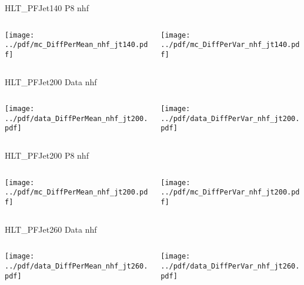 \documentclass[9pt]{beamer}
\begin{document}
\begin{frame}[t]{HLT\_PFJet140 P8 nhf}
\begin{columns}[T]
  \begin{column}{.5\textwidth}
  \texttt{[image: ../pdf/mc\_DiffPerMean\_nhf\_jt140.pdf]}
  \end{column}
  \begin{column}{.5\textwidth}
  \texttt{[image: ../pdf/mc\_DiffPerVar\_nhf\_jt140.pdf]}
  \end{column}
\end{columns}
\end{frame}

\begin{frame}[t]{HLT\_PFJet200 Data nhf}
\begin{columns}[T]
  \begin{column}{.5\textwidth}
  \texttt{[image: ../pdf/data\_DiffPerMean\_nhf\_jt200.pdf]}
  \end{column}
  \begin{column}{.5\textwidth}
  \texttt{[image: ../pdf/data\_DiffPerVar\_nhf\_jt200.pdf]}
  \end{column}
\end{columns}
\end{frame}

\begin{frame}[t]{HLT\_PFJet200 P8 nhf}
\begin{columns}[T]
  \begin{column}{.5\textwidth}
  \texttt{[image: ../pdf/mc\_DiffPerMean\_nhf\_jt200.pdf]}
  \end{column}
  \begin{column}{.5\textwidth}
  \texttt{[image: ../pdf/mc\_DiffPerVar\_nhf\_jt200.pdf]}
  \end{column}
\end{columns}
\end{frame}

\begin{frame}[t]{HLT\_PFJet260 Data nhf}
\begin{columns}[T]
  \begin{column}{.5\textwidth}
  \texttt{[image: ../pdf/data\_DiffPerMean\_nhf\_jt260.pdf]}
  \end{column}
  \begin{column}{.5\textwidth}
  \texttt{[image: ../pdf/data\_DiffPerVar\_nhf\_jt260.pdf]}
  \end{column}
\end{columns}
\end{frame}
\end{document}
